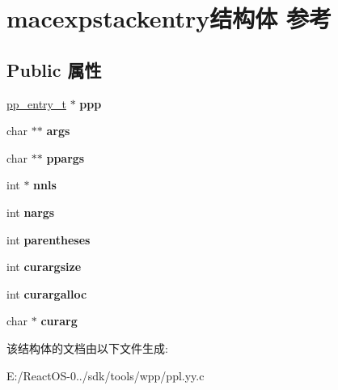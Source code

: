 \hypertarget{structmacexpstackentry}{}\section{macexpstackentry结构体 参考}
\label{structmacexpstackentry}
\subsection*{Public 属性}
\begin{DoxyCompactItemize}
\item 
\mbox{\label{structmacexpstackentry_a3f9e099a5545c045d31bd3f3e73e489d}} 
\hyperlink{structpp__entry}{pp\+\_\+entry\+\_\+t} $\ast$ {\bfseries ppp}
\item 
\mbox{\label{structmacexpstackentry_a4b5e7ff13e1dd8a9026c311ef3265608}} 
char $\ast$$\ast$ {\bfseries args}
\item 
\mbox{\label{structmacexpstackentry_a8af7b43077945a3c0dd9ed9d3c515c69}} 
char $\ast$$\ast$ {\bfseries ppargs}
\item 
\mbox{\label{structmacexpstackentry_ac9dbfbdc56f6098cbdecf9734d01f5c6}} 
int $\ast$ {\bfseries nnls}
\item 
\mbox{\label{structmacexpstackentry_a0b5a10f5dbdb3f0b30c81e463f3bd10d}} 
int {\bfseries nargs}
\item 
\mbox{\label{structmacexpstackentry_aed1340b07d8ec5dcf00d280aa1de2fc9}} 
int {\bfseries parentheses}
\item 
\mbox{\label{structmacexpstackentry_a7fb1f2090d9f97b6ab0fb6fc1e5c7acb}} 
int {\bfseries curargsize}
\item 
\mbox{\label{structmacexpstackentry_a05fe37dc4c220da9ccbd3f309f119010}} 
int {\bfseries curargalloc}
\item 
\mbox{\label{structmacexpstackentry_af8973f43e76f617362d32e85ece85175}} 
char $\ast$ {\bfseries curarg}
\end{DoxyCompactItemize}


该结构体的文档由以下文件生成\+:\begin{DoxyCompactItemize}
\item 
E\+:/\+React\+O\+S-\/0../sdk/tools/wpp/ppl.\+yy.\+c\end{DoxyCompactItemize}
